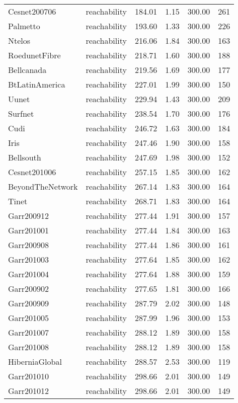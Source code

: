 \begin{tabular}{llrrrr}
Cesnet200706 & reachability & 184.01 & 1.15 & 300.00 & 261 \\
Palmetto & reachability & 193.60 & 1.33 & 300.00 & 226 \\
Ntelos & reachability & 216.06 & 1.84 & 300.00 & 163 \\
RoedunetFibre & reachability & 218.71 & 1.60 & 300.00 & 188 \\
Bellcanada & reachability & 219.56 & 1.69 & 300.00 & 177 \\
BtLatinAmerica & reachability & 227.01 & 1.99 & 300.00 & 150 \\
Uunet & reachability & 229.94 & 1.43 & 300.00 & 209 \\
Surfnet & reachability & 238.54 & 1.70 & 300.00 & 176 \\
Cudi & reachability & 246.72 & 1.63 & 300.00 & 184 \\
Iris & reachability & 247.46 & 1.90 & 300.00 & 158 \\
Bellsouth & reachability & 247.69 & 1.98 & 300.00 & 152 \\
Cesnet201006 & reachability & 257.15 & 1.85 & 300.00 & 162 \\
BeyondTheNetwork & reachability & 267.14 & 1.83 & 300.00 & 164 \\
Tinet & reachability & 268.71 & 1.83 & 300.00 & 164 \\
Garr200912 & reachability & 277.44 & 1.91 & 300.00 & 157 \\
Garr201001 & reachability & 277.44 & 1.84 & 300.00 & 163 \\
Garr200908 & reachability & 277.44 & 1.86 & 300.00 & 161 \\
Garr201003 & reachability & 277.64 & 1.85 & 300.00 & 162 \\
Garr201004 & reachability & 277.64 & 1.88 & 300.00 & 159 \\
Garr200902 & reachability & 277.65 & 1.81 & 300.00 & 166 \\
Garr200909 & reachability & 287.79 & 2.02 & 300.00 & 148 \\
Garr201005 & reachability & 287.99 & 1.96 & 300.00 & 153 \\
Garr201007 & reachability & 288.12 & 1.89 & 300.00 & 158 \\
Garr201008 & reachability & 288.12 & 1.89 & 300.00 & 158 \\
HiberniaGlobal & reachability & 288.57 & 2.53 & 300.00 & 119 \\
Garr201010 & reachability & 298.66 & 2.01 & 300.00 & 149 \\
Garr201012 & reachability & 298.66 & 2.01 & 300.00 & 149 \\

\end{tabular}
